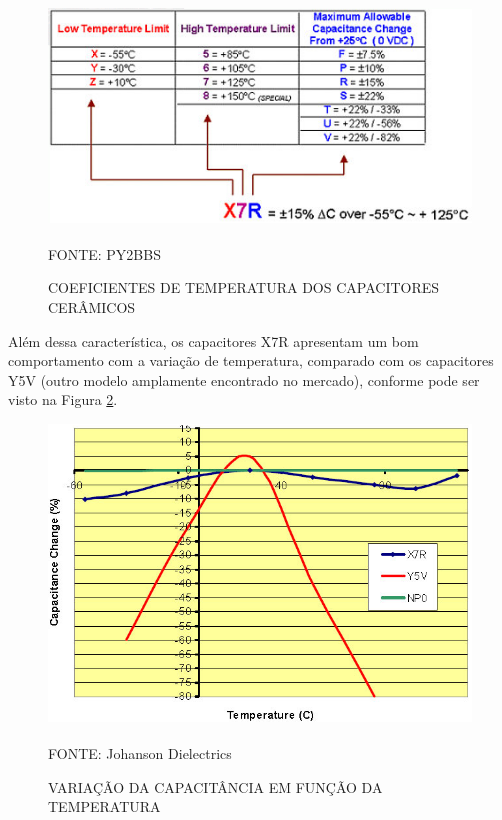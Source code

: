 \documentclass[
	12pt,				%
	openright,			%
	oneside,			%
	a4paper,			%
	english,			%
	french,				%
	spanish,			%
	brazil,				%
	oldfontcommands
	]{abntex2}
\begin{document}
	\begin{figure}[th]
		\caption{COEFICIENTES DE TEMPERATURA DOS CAPACITORES CERÂMICOS}
		\label{Fig_Cap}
		\centering
		\includegraphics[width=1.0\linewidth]{./figs/x7r}
			
		\begin{small}
			FONTE: PY2BBS\textsuperscript{\cite{x7r}}
		\end{small}		
	\end{figure}	
	
	Além dessa característica, os capacitores X7R apresentam um bom comportamento com a variação de temperatura, comparado com os capacitores Y5V (outro modelo amplamente encontrado no mercado), conforme pode ser visto na Figura \ref{Fig_Cap_Temp}.
	
	\begin{figure}[th]
		\caption{VARIAÇÃO DA CAPACITÂNCIA EM FUNÇÃO DA TEMPERATURA}
		\label{Fig_Cap_Temp}
		\centering
		\includegraphics[width=1.0\linewidth]{./figs/y5v}
			
		\begin{small}
			FONTE: Johanson Dielectrics\textsuperscript{\cite{y5v}}
		\end{small}		
	\end{figure}
	\pagebreak
\end{document}
